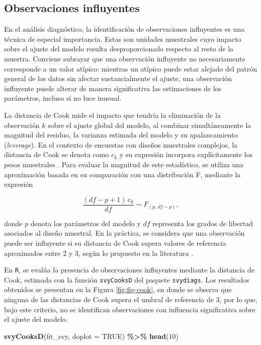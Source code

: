 \documentclass[
  spanish,
  12pt,
]{book}
\newenvironment{Shaded}{\begin{snugshade}}{\end{snugshade}}
\newcommand{\AttributeTok}[1]{\textcolor[rgb]{0.13,0.29,0.53}{#1}}
\newcommand{\ConstantTok}[1]{\textcolor[rgb]{0.56,0.35,0.01}{#1}}
\newcommand{\DecValTok}[1]{\textcolor[rgb]{0.00,0.00,0.81}{#1}}
\newcommand{\FunctionTok}[1]{\textcolor[rgb]{0.13,0.29,0.53}{\textbf{#1}}}
\newcommand{\NormalTok}[1]{#1}
\newcommand{\SpecialCharTok}[1]{\textcolor[rgb]{0.81,0.36,0.00}{\textbf{#1}}}
\begin{document}
\subsection{Observaciones influyentes}\label{observaciones-influyentes}

En el análisis diagnóstico, la identificación de observaciones influyentes es una técnica de especial importancia. Estas son unidades muestrales cuyo impacto sobre el ajuste del modelo resulta desproporcionado respecto al resto de la muestra. Conviene subrayar que una observación influyente no necesariamente corresponde a un valor atípico: mientras un atípico puede estar alejado del patrón general de los datos sin afectar sustancialmente el ajuste, una observación influyente puede alterar de manera significativa las estimaciones de los parámetros, incluso si no luce inusual.

La distancia de Cook mide el impacto que tendría la eliminación de la observación \(k\) sobre el ajuste global del modelo, al combinar simultáneamente la magnitud del residuo, la varianza estimada del modelo y su apalancamiento (\emph{leverage}). En el contexto de encuestas con diseños muestrales complejos, la distancia de Cook se denota como \(c_k\) y su expresión incorpora explícitamente los pesos muestrales \citep[página 213]{heeringa2017applied}. Para evaluar la magnitud de este estadístico, se utiliza una aproximación basada en su comparación con una distribución F, mediante la expresión

\[
\frac{(df-p+1)\,c_{k}}{df} \sim F_{(p,\,df-p)},
\]

donde \(p\) denota los parámetros del modelo y \(df\) representa los grados de libertad asociados al diseño muestral. En la práctica, se considera que una observación puede ser influyente si su distancia de Cook supera valores de referencia aproximados entre 2 y 3, según lo propuesto en la literatura \citep{heeringa2017applied}.

En \texttt{R}, se evalúa la presencia de observaciones influyentes mediante la distancia de Cook, estimada con la función \texttt{svyCooksD} del paquete \texttt{svydiags}. Los resultados obtenidos se presentan en la Figura \ref{fig:fig-cook}, en donde se observa que ninguna de las distancias de Cook supera el umbral de referencia de 3, por lo que, bajo este criterio, no se identifican observaciones con influencia significativa sobre el ajuste del modelo.

\begin{Shaded}
\begin{Highlighting}[]
\FunctionTok{svyCooksD}\NormalTok{(fit\_svy, }\AttributeTok{doplot =} \ConstantTok{TRUE}\NormalTok{) }\SpecialCharTok{\%\textgreater{}\%}
  \FunctionTok{head}\NormalTok{(}\DecValTok{10}\NormalTok{)}
\end{Highlighting}
\end{Shaded}
\end{document}
